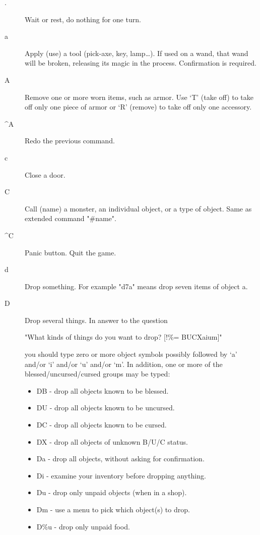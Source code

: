 \documentclass[11pt]{article}
\begin{document}
\begin{description}
\item[{.}] Wait or rest, do nothing for one turn.

\item[{a}] Apply (use) a tool (pick-axe, key, lamp\ldots{}). If used on a wand,
that wand will be broken, releasing its magic in the
process. Confirmation is required.

\item[{A}] Remove one or more worn items, such as armor. Use `T' (take
off) to take off only one piece of armor or `R' (remove) to take off
only one accessory.

\item[{\^{}A}] Redo the previous command.

\item[{c}] Close a door.

\item[{C}] Call (name) a monster, an individual object, or a type of
object. Same as extended command "\#name".

\item[{\^{}C}] Panic button. Quit the game.

\item[{d}] Drop something. For example "d7a" means drop seven items of
object a.

\item[{D}] Drop several things. In answer to the question

"What kinds of things do you want to drop? [!\%= BUCXaium]"

you should type zero or more object symbols possibly followed by `a'
and/or `i' and/or `u' and/or `m'. In addition, one or more of the
blessed/uncursed/cursed groups may be typed:  

\begin{itemize}
\item DB - drop all objects known to be blessed.
\item DU - drop all objects known to be uncursed.
\item DC - drop all objects known to be cursed.
\item DX - drop all objects of unknown B/U/C status.
\item Da - drop all objects, without asking for confirmation.
\item Di - examine your inventory before dropping anything.
\item Du - drop only unpaid objects (when in a shop).
\item Dm - use a menu to pick which object(s) to drop.
\item D\%u - drop only unpaid food.
\end{itemize}


\end{description}
\end{document}
